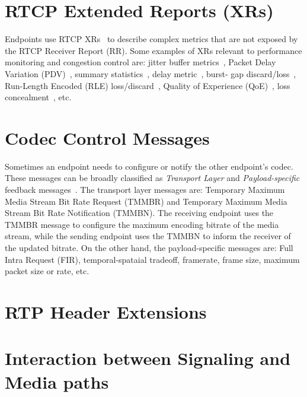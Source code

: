 \section{RTCP Extended Reports (XRs)}

Endpoints use RTCP XRs~\cite{rfc3611} to describe complex metrics that are not
exposed by the RTCP Receiver Report (RR). Some examples of XRs relevant to
performance monitoring and congestion control are: jitter buffer
metrics~\cite{draft.xr.jb}, Packet Delay Variation (PDV)~\cite{rfc6798},
summary statistics~\cite{draft.xr.stat}, delay metric~\cite{rfc6843}, burst-
gap discard/loss~\cite{draft.xr.bg.loss, draft.xr.bg.discard}, Run-Length
Encoded (RLE) loss/discard~\cite{draft.xr.discard.rle}, Quality of Experience
(QoE)~\cite{draft.xr.qoe}, loss concealment~\cite{draft.xr.conceal}, etc.





\section{Codec Control Messages}

Sometimes an endpoint needs to configure or notify the other endpoint's codec.
These messages can be broadly classified as \emph{Transport Layer} and  \emph
{Payload-specific} feedback messages~\cite{rfc5104}. The transport layer
messages are: Temporary Maximum Media Stream Bit Rate Request (TMMBR) and
Temporary Maximum Media Stream Bit Rate Notification (TMMBN). The receiving
endpoint uses the TMMBR message to configure the maximum encoding bitrate of
the media stream, while the sending endpoint uses the TMMBN to inform the
receiver of the updated bitrate. On the other hand, the payload-specific
messages are: Full Intra Request (FIR), temporal-spataial tradeoff, framerate,
frame size, maximum packet size or rate, etc.



\section{RTP Header Extensions}

\section{Interaction between Signaling and Media paths}

